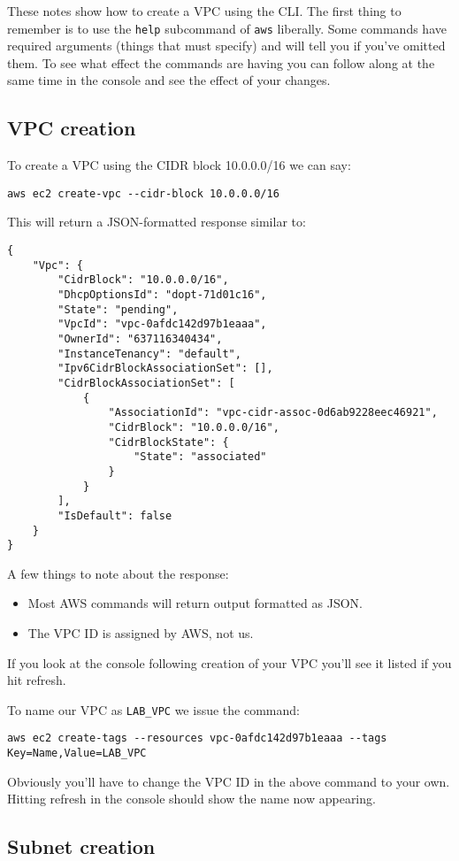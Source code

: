 \documentclass{pgnotes}
\begin{document}
These notes show how to create a VPC using the CLI.
The first thing to remember is to use the \texttt{help} subcommand of \texttt{aws} liberally.
Some commands have required arguments (things that must specify) and will tell you if you've omitted them.
To see what effect the commands are having you can follow along at the same time in the console and see the effect of your changes.

\subsection{VPC creation}

To create a VPC using the CIDR block 10.0.0.0/16 we can say:
\begin{verbatim}
aws ec2 create-vpc --cidr-block 10.0.0.0/16
\end{verbatim}
This will return a JSON-formatted response similar to:
\begin{verbatim}
{
    "Vpc": {
        "CidrBlock": "10.0.0.0/16",
        "DhcpOptionsId": "dopt-71d01c16",
        "State": "pending",
        "VpcId": "vpc-0afdc142d97b1eaaa",
        "OwnerId": "637116340434",
        "InstanceTenancy": "default",
        "Ipv6CidrBlockAssociationSet": [],
        "CidrBlockAssociationSet": [
            {
                "AssociationId": "vpc-cidr-assoc-0d6ab9228eec46921",
                "CidrBlock": "10.0.0.0/16",
                "CidrBlockState": {
                    "State": "associated"
                }
            }
        ],
        "IsDefault": false
    }
}
\end{verbatim}
A few things to note about the response:
\begin{itemize}
\item Most AWS commands will return output formatted as JSON.
\item The VPC ID is assigned by AWS, not us.
\end{itemize}
If you look at the console following creation of your VPC you'll see it listed if you hit refresh.

To name our VPC as \texttt{LAB\_VPC} we issue the command:
\begin{verbatim}
aws ec2 create-tags --resources vpc-0afdc142d97b1eaaa --tags Key=Name,Value=LAB_VPC
\end{verbatim}
Obviously you'll have to change the VPC ID in the above command to your own. 
Hitting refresh in the console should show the name now appearing.

\subsection{Subnet creation}
\end{document}
